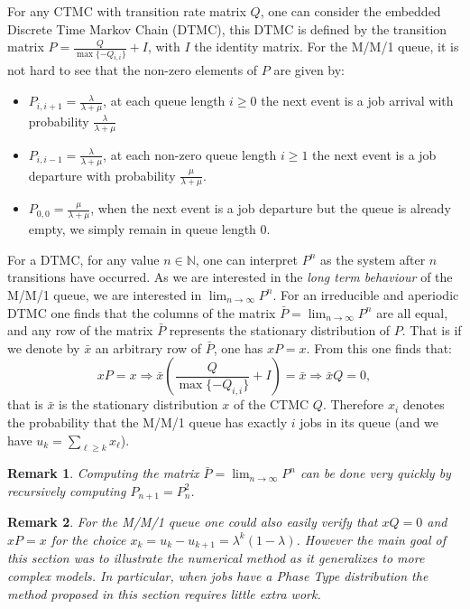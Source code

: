\documentclass[12pt]{report}
\newtheorem{remark}{Remark}
\begin{document}
\begin{appendices}
For any CTMC with transition rate matrix $Q$, one can consider the embedded Discrete Time Markov Chain (DTMC), this DTMC is defined by the transition matrix $P = \frac{Q}{\max\{-Q_{i,i}\}} + I$, with $I$ the identity matrix. For the M/M/1 queue, it is not hard to see that the non-zero elements of $P$ are given by:
\begin{itemize}
\item $P_{i,i+1} = \frac{\lambda}{\lambda + \mu}$, at each queue length $i \geq 0$ the next event is a job arrival with probability $\frac{\lambda}{\lambda + \mu}$
\item $P_{i,i-1} = \frac{\lambda}{\lambda + \mu}$, at each non-zero queue length $i \geq 1$ the next event is a job departure with probability $\frac{\mu}{\lambda + \mu}$.
\item $P_{0,0} = \frac{\mu}{\lambda + \mu}$, when the next event is a job departure but the queue is already empty, we simply remain in queue length $0$.
\end{itemize}
For a DTMC, for any value $n \in \mathbb{N}$, one can interpret $P^n$ as the system after $n$ transitions have occurred. As we are interested in the \textit{long term behaviour} of the M/M/1 queue, we are interested in $\lim_{n\rightarrow \infty} P^n$. For an irreducible and aperiodic DTMC one finds that the columns of the matrix $\bar P = \lim_{n\rightarrow \infty} P^n$ are all equal, and any row of the matrix $\bar P$ represents the stationary distribution of $P$. That is if we denote by $\bar x$ an arbitrary row of $\bar P$, one has $xP=x$. From this one finds that:
$$
xP=x \Rightarrow \bar x\left(\frac{Q}{\max\{-Q_{i,i}\}} + I\right) = \bar x \Rightarrow \bar x Q =0,
$$
that is $\bar x$ is the stationary distribution $x$ of the CTMC $Q$. Therefore $x_i$ denotes the probability that the M/M/1 queue has exactly $i$ jobs in its queue (and we have $u_k = \sum_{\ell \geq k} x_\ell$).
\begin{remark}
Computing the matrix $\bar P = \lim_{n\rightarrow \infty} P^n$ can be done very quickly by recursively computing $P_{n+1} = P_n^2$.
\end{remark}
\begin{remark}
For the M/M/1 queue one could also easily verify that $xQ=0$ and $xP=x$ for the choice $x_k = u_k - u_{k+1} = \lambda^k(1-\lambda)$. However the main goal of this section was to illustrate the numerical method as it generalizes to more complex models. In particular, when jobs have a Phase Type distribution the method proposed in this section requires little extra work.
\end{remark}


\end{appendices}
\end{document}

